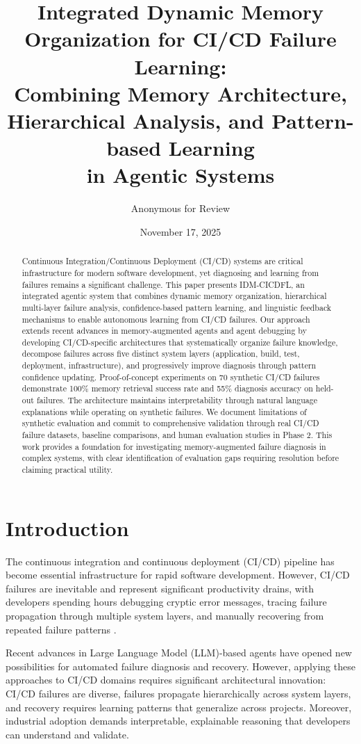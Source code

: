 \documentclass[11pt]{article}
\title{Integrated Dynamic Memory Organization for CI/CD Failure Learning: \\
        Combining Memory Architecture, Hierarchical Analysis, and Pattern-based Learning \\
        in Agentic Systems}
\author{Anonymous for Review}
\date{November 17, 2025}
\begin{document}
\maketitle

\begin{abstract}
Continuous Integration/Continuous Deployment (CI/CD) systems are critical infrastructure for modern software development, yet diagnosing and learning from failures remains a significant challenge. This paper presents IDM-CICDFL, an integrated agentic system that combines dynamic memory organization, hierarchical multi-layer failure analysis, confidence-based pattern learning, and linguistic feedback mechanisms to enable autonomous learning from CI/CD failures. Our approach extends recent advances in memory-augmented agents and agent debugging by developing CI/CD-specific architectures that systematically organize failure knowledge, decompose failures across five distinct system layers (application, build, test, deployment, infrastructure), and progressively improve diagnosis through pattern confidence updating. Proof-of-concept experiments on 70 synthetic CI/CD failures demonstrate 100\% memory retrieval success rate and 55\% diagnosis accuracy on held-out failures. The architecture maintains interpretability through natural language explanations while operating on synthetic failures. We document limitations of synthetic evaluation and commit to comprehensive validation through real CI/CD failure datasets, baseline comparisons, and human evaluation studies in Phase 2. This work provides a foundation for investigating memory-augmented failure diagnosis in complex systems, with clear identification of evaluation gaps requiring resolution before claiming practical utility.
\end{abstract}

\section{Introduction}

The continuous integration and continuous deployment (CI/CD) pipeline has become essential infrastructure for rapid software development. However, CI/CD failures are inevitable and represent significant productivity drains, with developers spending hours debugging cryptic error messages, tracing failure propagation through multiple system layers, and manually recovering from repeated failure patterns \citep{Vasallo2019}.

Recent advances in Large Language Model (LLM)-based agents have opened new possibilities for automated failure diagnosis and recovery. However, applying these approaches to CI/CD domains requires significant architectural innovation: CI/CD failures are diverse, failures propagate hierarchically across system layers, and recovery requires learning patterns that generalize across projects. Moreover, industrial adoption demands interpretable, explainable reasoning that developers can understand and validate.
\end{document}
